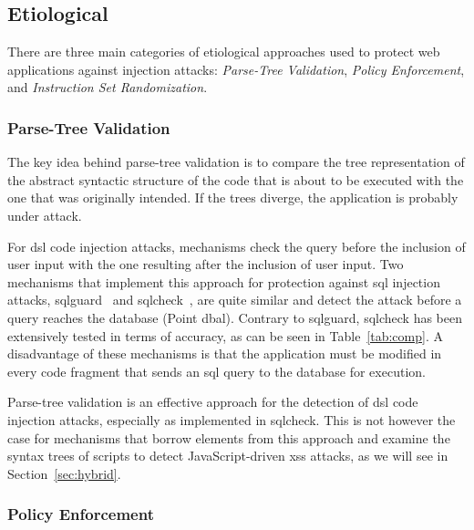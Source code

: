 \documentclass[10pt,journal,compsoc]{IEEEtran}
\begin{document}
\subsection{Etiological}
\label{sec:prot}
\vspace{-0.5mm}

There are three main categories of etiological approaches used to protect web
applications against injection attacks:
\emph{Parse-Tree Validation},
\emph{Policy Enforcement}, and
\emph{Instruction Set Randomization}.
\vspace{-3.5mm}

\subsubsection{Parse-Tree Validation}
\label{sec:tree}
\vspace{-1mm}

The key idea behind parse-tree validation is to compare the tree
representation of the abstract syntactic structure of the code
that is about to be executed with the one that was originally
intended. If the trees diverge, the application is probably under
attack.

For {\sc dsl} code injection attacks, mechanisms check 
the query before the inclusion of user input with the one
resulting after the inclusion of user input.
Two mechanisms that implement this approach for protection
against {\sc sql} injection attacks,
{\sc sqlg}uard~\cite{BWS05} and
{\sc sql}check~\cite{SW06}, are quite similar
and detect the attack before a query reaches the
database (Point {\sc dbal}).
Contrary to {\sc sqlg}uard,
{\sc sql}check has been
extensively tested in terms of accuracy,
as can be seen in Table~\ref{tab:comp}.
A disadvantage of these mechanisms is that the
application must be modified in every code fragment
that sends an {\sc sql} query to the database for execution.

Parse-tree validation is an effective approach
for the detection of {\sc dsl} code injection attacks,
especially as implemented in {\sc sql}check.
This is not however the case
for mechanisms that borrow elements from
this approach and examine the syntax trees
of scripts to detect JavaScript-driven {\sc xss} attacks,
as we will see in Section~\ref{sec:hybrid}.
\vspace{-0.5mm}

\subsubsection{Policy Enforcement}
\label{sec:policy}
\vspace{-0.5mm}
\end{document}
